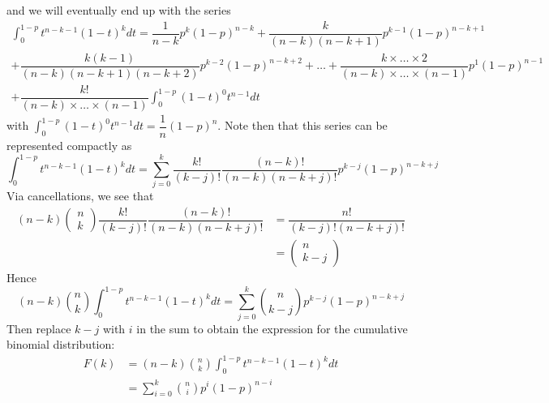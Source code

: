\documentclass[11pt]{report} %
\begin{document}
and we will eventually end up with the series
\begin{multline}
\int_{0}^{1 - p}t^{n - k - 1}\left(1 - t\right)^{k}dt = \dfrac{1}{n - k}p^{k}\left(1 - p\right)^{n - k} + \dfrac{k}{\left(n - k\right)\left(n - k + 1\right)}p^{k - 1}\left(1 - p\right)^{n - k + 1} \\
 + \dfrac{k\left(k - 1\right)}{\left(n - k\right)\left(n - k + 1\right)\left(n - k + 2\right)}p^{k - 2}\left(1 - p\right)^{n - k + 2} + \dots + \dfrac{k\times\dots\times 2}{\left(n - k\right)\times\dots\times\left(n - 1\right)}p^{1}\left(1 - p\right)^{n - 1} \\
  + \dfrac{k!}{\left(n - k\right)\times\dots\times\left(n - 1\right)}\int_{0}^{1 - p}\left(1 - t\right)^{0}t^{n - 1}dt
\end{multline}
with $\int_{0}^{1 - p}\left(1 - t\right)^{0}t^{n - 1}dt = \dfrac{1}{n}\left(1 - p\right)^{n}$. Note then that this series can be represented compactly as
\begin{equation}
\int_{0}^{1 - p}t^{n - k - 1}\left(1 - t\right)^{k}dt = \sum_{j = 0}^{k}\dfrac{k!}{\left(k - j\right)!}\dfrac{\left(n - k\right)!}{\left(n - k\right)\left(n - k + j\right)!}p^{k - j}\left(1 - p\right)^{n - k + j}
\end{equation}
Via cancellations, we see that
\begin{align}
\left(n - k\right)\begin{pmatrix}n \\ k\end{pmatrix}\dfrac{k!}{\left(k - j\right)!}\dfrac{\left(n - k\right)!}{\left(n - k\right)\left(n - k + j\right)!} &= \dfrac{n!}{\left(k - j\right)!\left(n - k + j\right)!} \\
&= \begin{pmatrix}n \\ k - j\end{pmatrix}
\end{align}
Hence
\begin{equation}
\left(n - k\right)\binom{n}{k}\int_{0}^{1 - p}t^{n - k - 1}\left(1 - t\right)^{k}dt = \sum_{j = 0}^{k}\binom{n}{k - j}p^{k - j}\left(1 - p\right)^{n - k + j}
\end{equation}
Then replace $k - j$ with $i$ in the sum to obtain the expression for the cumulative binomial distribution:
\begin{align}
F\left(k\right) &= \left(n - k\right)\binom{n}{k}\int_{0}^{1 - p}t^{n - k - 1}\left(1 - t\right)^{k}dt \\
&= \sum_{i = 0}^{k}\binom{n}{i}p^{i}\left(1 - p\right)^{n - i}
\end{align}
\end{document}
